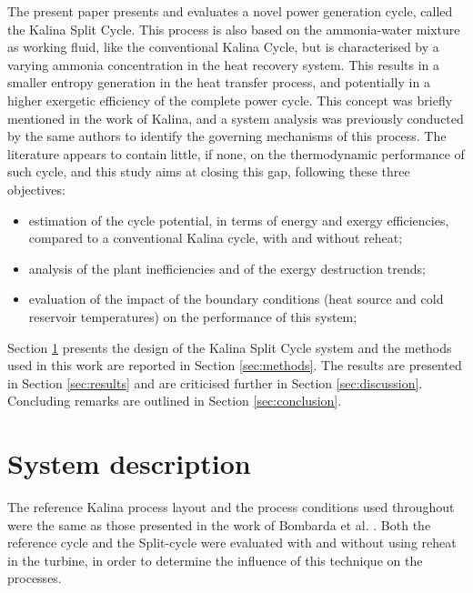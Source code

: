 \documentclass[final,times,5p]{elsarticle}
\begin{document}
The present paper presents and evaluates a novel power generation cycle, called the Kalina Split Cycle. This process is also based on the ammonia-water mixture as working fluid, like the conventional Kalina Cycle, but is characterised by a varying ammonia concentration in the heat recovery system. This results in a smaller entropy generation in the heat transfer process, and potentially in a higher exergetic efficiency of the complete power cycle. This concept was briefly mentioned in the work of Kalina, and a system analysis was previously conducted by the same authors to identify the governing mechanisms of this process. The literature appears to contain little, if none, on the thermodynamic performance of such cycle, and this study aims at closing this gap, following these three objectives:

\begin{itemize}

	\item estimation of the cycle potential, in terms of energy and exergy efficiencies, compared to a conventional Kalina cycle, with and without reheat;
	\item analysis of the plant inefficiencies and of the exergy destruction trends;
	\item evaluation of the impact of the boundary conditions (heat source and cold reservoir temperatures) on the performance of this system;

\end{itemize}

Section \ref{sec:system_description} presents the design of the Kalina Split Cycle system and the methods used in this work are reported in Section \ref{sec:methods}. The results are presented in Section \ref{sec:results} and are criticised further in Section \ref{sec:discussion}. Concluding remarks are outlined in Section \ref{sec:conclusion}.




\section{System description}
\label{sec:system_description} 
The reference Kalina process layout and the process conditions used throughout were the same as those presented in the work of Bombarda et al. \cite{Bombarda2010b}. Both the reference cycle and the Split-cycle were evaluated with and without using reheat in the turbine, in order to determine the influence of this technique on the processes. 
\end{document}
